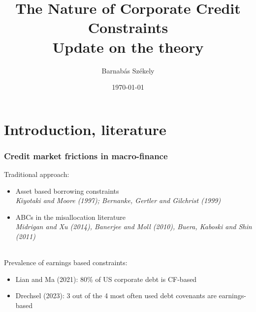 \documentclass[notes]{beamer}
\title[]{The Nature of Corporate Credit Constraints \\
\small Update on the theory} %
\author{Barnab\'as Sz\'ekely} %
\date{\today } %
\begin{document}
\renewcommand{\arraystretch}{1.4}

\begin{frame}
\titlepage %
\end{frame}



\section{Introduction, literature}
\begin{frame}[label=1] 
\frametitle{Credit market frictions in macro-finance}
Traditional approach:
\begin{itemize} \setlength\itemsep{0em} \small
    \item Asset based borrowing constraints \\
    \textit{Kiyotaki and Moore (1997); Bernanke, Gertler and Gilchrist (1999)}   
    \item ABCs in the misallocation literature \\ \textit{Midrigan and Xu (2014), Banerjee and Moll (2010), Buera, Kaboski and Shin (2011)}
\end{itemize} \normalsize \vspace{5mm} \\

Prevalence of earnings based constraints:
\begin{itemize} \setlength\itemsep{0em} \small
    \item Lian and Ma (2021): 80\% of US corporate debt is CF-based
    \item Drechsel (2023): 3 out of the 4 most often used debt covenants are earnings-based
\end{itemize} \normalsize

\end{frame}
\end{document}

